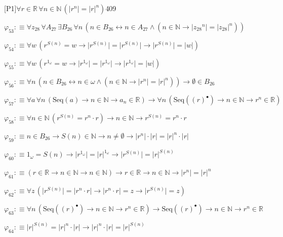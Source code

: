 \begin{fullproof}{[P1]}{$\forall r \in \mathbb{R}\,\forall n \in \mathbb{N}\,(\lvert {{r}^{n}} \rvert = {{\lvert r \rvert}^{n}})$}{409}
\begin{abbrevlist}
\item $\varphi_{53} :\equiv \forall z_{28}\,\forall A_{27}\,\exists B_{26}\,\forall n\,(n \in B_{26} \leftrightarrow n \in A_{27} \land (n \in \mathbb{N} \to \lvert {{z_{28}}^{n}} \rvert = {{\lvert z_{28} \rvert}^{n}}))$
\item $\varphi_{54} :\equiv \forall w\,({{r}^{S(n)}} = w \to \lvert {{r}^{S(n)}} \rvert = \lvert {{r}^{S(n)}} \rvert \to \lvert {{r}^{S(n)}} \rvert = \lvert w \rvert)$
\item $\varphi_{55} :\equiv \forall w\,({{r}^{1_{\omega}}} = w \to \lvert {{r}^{1_{\omega}}} \rvert = \lvert {{r}^{1_{\omega}}} \rvert \to \lvert {{r}^{1_{\omega}}} \rvert = \lvert w \rvert)$
\item $\varphi_{56} :\equiv \forall n\,(n \in B_{26} \leftrightarrow n \in \omega \land (n \in \mathbb{N} \to \lvert {{r}^{n}} \rvert = {{\lvert r \rvert}^{n}})) \to \emptyset \in B_{26}$
\item $\varphi_{57} :\equiv \forall a\,\forall n\,(\mathrm{Seq}(a) \to n \in \mathbb{N} \to a_{n} \in \mathbb{R}) \to \forall n\,(\mathrm{Seq}({(r)^{\bullet}}) \to n \in \mathbb{N} \to {{r}^{n}} \in \mathbb{R})$
\item $\varphi_{58} :\equiv \forall n \in \mathbb{N}\,({{r}^{S(n)}} = {{r}^{n}} \cdot r) \to n \in \mathbb{N} \to {{r}^{S(n)}} = {{r}^{n}} \cdot r$
\item $\varphi_{59} :\equiv n \in B_{26} \to S(n) \in \mathbb{N} \to n \neq \emptyset \to \lvert {{r}^{n}} \rvert \cdot \lvert r \rvert = {{\lvert r \rvert}^{n}} \cdot \lvert r \rvert$
\item $\varphi_{60} :\equiv 1_{\omega} = S(n) \to \lvert {{r}^{1_{\omega}}} \rvert = {{\lvert r \rvert}^{1_{\omega}}} \to \lvert {{r}^{S(n)}} \rvert = {{\lvert r \rvert}^{S(n)}}$
\item $\varphi_{61} :\equiv (r \in \mathbb{R} \to n \in \mathbb{N} \to n \in \mathbb{N}) \to r \in \mathbb{R} \to n \in \mathbb{N} \to \lvert {{r}^{n}} \rvert = {{\lvert r \rvert}^{n}}$
\item $\varphi_{62} :\equiv \forall z\,(\lvert {{r}^{S(n)}} \rvert = \lvert {{r}^{n}} \cdot r \rvert \to \lvert {{r}^{n}} \cdot r \rvert = z \to \lvert {{r}^{S(n)}} \rvert = z)$
\item $\varphi_{63} :\equiv \forall n\,(\mathrm{Seq}({(r)^{\bullet}}) \to n \in \mathbb{N} \to {{r}^{n}} \in \mathbb{R}) \to \mathrm{Seq}({(r)^{\bullet}}) \to n \in \mathbb{N} \to {{r}^{n}} \in \mathbb{R}$
\item $\varphi_{64} :\equiv {{\lvert r \rvert}^{S(n)}} = {{\lvert r \rvert}^{n}} \cdot \lvert r \rvert \to {{\lvert r \rvert}^{n}} \cdot \lvert r \rvert = {{\lvert r \rvert}^{S(n)}}$

\end{abbrevlist}
\end{fullproof}
